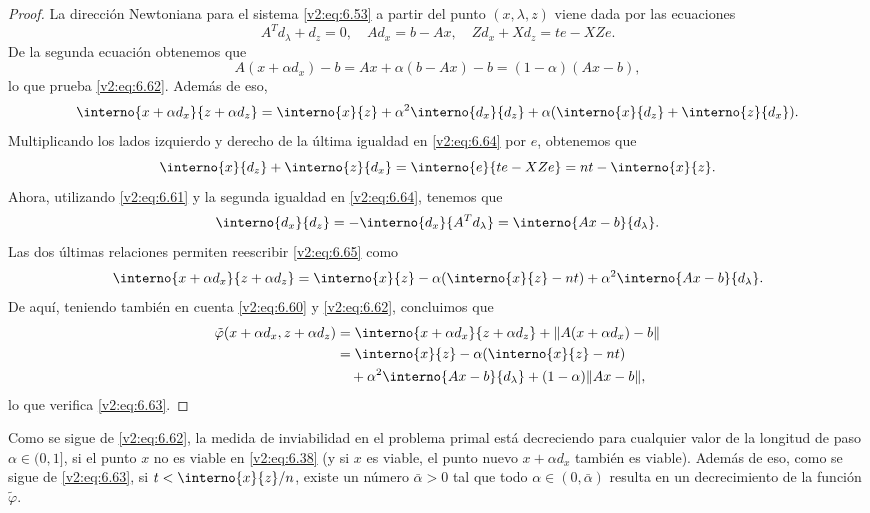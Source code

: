 \begin{proof}
    La dirección Newtoniana para el sistema \eqref{v2:eq:6.53} a partir del punto $(x, \lambda, z)$ viene dada por las ecuaciones
    \begin{equation}
        A^T d_\lambda + d_z = 0, \quad A d_x = b - Ax, \quad Z d_x + X d_z = te - XZe.
        \label{v2:eq:6.64}
    \end{equation}
    De la segunda ecuación obtenemos que
    \[
        A(x + \alpha d_x) - b = Ax + \alpha(b - Ax) - b = (1 - \alpha)(Ax - b),
    \]
    lo que prueba \eqref{v2:eq:6.62}.
    Además de eso,
    \begin{equation}
        \interno{x + \alpha d_x}{z + \alpha d_z} = \interno{x}{z} + \alpha^2 \interno{d_x}{d_z} + \alpha (\interno{x}{d_z} + \interno{z}{d_x}).
        \label{v2:eq:6.65}
    \end{equation}
    Multiplicando los lados izquierdo y derecho de la última igualdad en \eqref{v2:eq:6.64} por $e$, obtenemos que
    \[
        \interno{x}{d_z} + \interno{z}{d_x} = \interno{e}{te - XZe} = nt - \interno{x}{z}.
    \]
    Ahora, utilizando \eqref{v2:eq:6.61} y la segunda igualdad en \eqref{v2:eq:6.64}, tenemos que
    \[
        \interno{d_x}{d_z} = -\interno{d_x}{A^T d_\lambda} = \interno{Ax - b}{d_\lambda}.
    \]
    Las dos últimas relaciones permiten reescribir \eqref{v2:eq:6.65} como
    \[
        \interno{x + \alpha d_x}{z + \alpha d_z} = \interno{x}{z} - \alpha (\interno{x}{z} - nt) + \alpha^2 \interno{Ax - b}{d_\lambda}.
    \]
    De aquí, teniendo también en cuenta \eqref{v2:eq:6.60} y \eqref{v2:eq:6.62}, concluimos que
    \begin{align*}
        \tilde{\varphi}(x + \alpha d_x, z + \alpha d_z) &= \interno{x + \alpha d_x}{z + \alpha d_z} + \norm{A(x + \alpha d_x) - b} \\
        &= \interno{x}{z} - \alpha(\interno{x}{z} - nt) \\
        &\quad + \alpha^2 \interno{Ax - b}{d_\lambda} + (1 - \alpha) \norm{Ax - b},
    \end{align*}
    lo que verifica \eqref{v2:eq:6.63}.
\end{proof}

Como se sigue de \eqref{v2:eq:6.62}, la medida de inviabilidad en el problema primal está decreciendo para cualquier valor de la longitud de paso $\alpha \in (0, 1]$, si el punto $x$ no es viable en \eqref{v2:eq:6.38} (y si $x$ es viable, el punto nuevo $x + \alpha d_x$ también es viable). Además de eso, como se sigue de \eqref{v2:eq:6.63}, si $t < \interno{x}{z}/n$, existe un número $\bar{\alpha} > 0$ tal que todo $\alpha \in (0, \bar{\alpha})$ resulta en un decrecimiento de la función $\tilde{\varphi}$.

